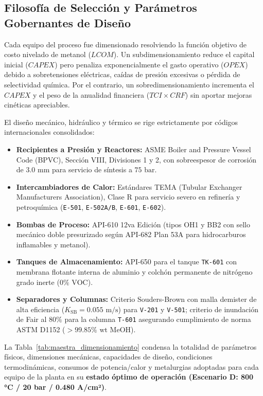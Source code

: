 \documentclass[11pt,letterpaper]{article}
\begin{document}
\subsection{Filosofía de Selección y Parámetros Gobernantes de Diseño}
Cada equipo del proceso fue dimensionado resolviendo la función objetivo de costo nivelado de metanol ($LCOM$). Un subdimensionamiento reduce el capital inicial ($CAPEX$) pero penaliza exponencialmente el gasto operativo ($OPEX$) debido a sobretensiones eléctricas, caídas de presión excesivas o pérdida de selectividad química. Por el contrario, un sobredimensionamiento incrementa el $CAPEX$ y el peso de la anualidad financiera ($TCI \times CRF$) sin aportar mejoras cinéticas apreciables.

El diseño mecánico, hidráulico y térmico se rige estrictamente por códigos internacionales consolidados:
\begin{itemize}
    \item \textbf{Recipientes a Presión y Reactores:} ASME Boiler and Pressure Vessel Code (BPVC), Sección VIII, Divisiones 1 y 2, con sobreespesor de corrosión de $3.0\text{ mm}$ para servicio de síntesis a $75\text{ bar}$.
    \item \textbf{Intercambiadores de Calor:} Estándares TEMA (Tubular Exchanger Manufacturers Association), Clase R para servicio severo en refinería y petroquímica (\texttt{E-501}, \texttt{E-502A/B}, \texttt{E-601}, \texttt{E-602}).
    \item \textbf{Bombas de Proceso:} API-610 12va Edición (tipos OH1 y BB2 con sello mecánico doble presurizado según API-682 Plan 53A para hidrocarburos inflamables y metanol).
    \item \textbf{Tanques de Almacenamiento:} API-650 para el tanque \texttt{TK-601} con membrana flotante interna de aluminio y colchón permanente de nitrógeno grado inerte ($0\%\text{ VOC}$).
    \item \textbf{Separadores y Columnas:} Criterio Souders-Brown con malla demister de alta eficiencia ($K_{\text{SB}} = 0.055\text{ m/s}$) para \texttt{V-201} y \texttt{V-501}; criterio de inundación de Fair al $80\%$ para la columna \texttt{T-601} asegurando cumplimiento de norma ASTM D1152 ($>99.85\%\text{ wt}$ MeOH).
\end{itemize}

La Tabla~\ref{tab:maestra_dimensionamiento} condensa la totalidad de parámetros físicos, dimensiones mecánicas, capacidades de diseño, condiciones termodinámicas, consumos de potencia/calor y metalurgias adoptadas para cada equipo de la planta en su \textbf{estado óptimo de operación (Escenario D: 800 °C / 20 bar / 0.480 A/cm²)}.
\end{document}
